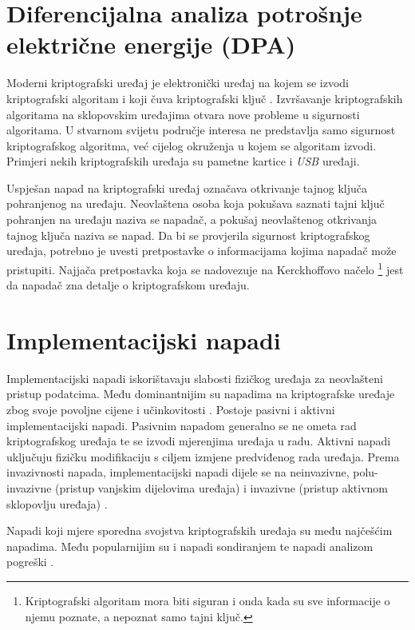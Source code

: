 \documentclass[times, utf8, numeric, diplomski]{fer}
\begin{document}
\section{Diferencijalna analiza potrošnje električne energije (DPA)}

Moderni kriptografski uređaj je elektronički uređaj na kojem se izvodi kriptografski algoritam i koji čuva kriptografski ključ \citep{paa_book}. Izvršavanje kriptografskih algoritama na sklopovskim uređajima otvara nove probleme u sigurnosti algoritama. U stvarnom svijetu područje interesa ne predstavlja samo sigurnost kriptografskog algoritma, već cijelog okruženja u kojem se algoritam izvodi. Primjeri nekih kriptografskih uređaja su pametne kartice i \textit{USB} uređaji.

Uspješan napad na kriptografski uređaj označava otkrivanje tajnog ključa pohranjenog na uređaju. Neovlaštena osoba koja pokušava saznati tajni ključ pohranjen na uređaju naziva se napadač, a pokušaj neovlaštenog otkrivanja tajnog ključa naziva se napad. Da bi se provjerila sigurnost kriptografskog uređaja, potrebno je uvesti pretpostavke o informacijama kojima napadač može pristupiti. Najjača pretpostavka koja se nadovezuje na Kerckhoffovo načelo \footnote{Kriptografski algoritam mora biti siguran i onda kada su sve informacije o njemu poznate, a nepoznat samo tajni ključ.} jest da napadač zna detalje o kriptografskom uređaju.

\section{Implementacijski napadi}
\label{sec:implatt}

Implementacijski napadi iskorištavaju slabosti fizičkog uređaja za neovlašteni pristup podatcima. Među dominantnijim su napadima na kriptografske uređaje zbog svoje povoljne cijene i učinkovitosti \citep{picekphd}. Postoje pasivni i aktivni implementacijski napadi. Pasivnim napadom generalno se ne ometa rad kriptografskog uređaja te se izvodi mjerenjima uređaja u radu. Aktivni napadi uključuju fizičku modifikaciju s ciljem izmjene predviđenog rada uređaja. Prema invazivnosti napada, implementacijski napadi dijele se na neinvazivne, polu-invazivne (pristup vanjskim dijelovima uređaja) i invazivne (pristup aktivnom sklopovlju uređaja) \citep{picekphd}. 

Napadi koji mjere sporedna svojstva kriptografskih uređaja  su među najčešćim napadima. Među popularnijim su i napadi sondiranjem  \citep{paa_book} te napadi analizom pogreški .
\end{document}
